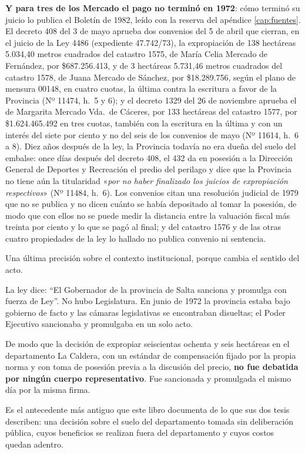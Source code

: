 \textbf{Y para tres de los Mercado el pago no terminó en 1972}: cómo terminó su juicio lo publica el Boletín de 1982, leído con la reserva del apéndice \ref{cap:fuentes}. El decreto 408 del 3 de mayo aprueba dos convenios del 5 de abril que cierran, en el juicio de la Ley 4486 (expediente 47.742/73), la expropiación de 138 hectáreas 5.034,40 metros cuadrados del catastro 1575, de María Celia Mercado de Fernández, por \$687.256.413, y de 3 hectáreas 5.731,46 metros cuadrados del catastro 1578, de Juana Mercado de Sánchez, por \$18.289.756, según el plano de mensura 00148, en cuatro cuotas, la última contra la escritura a favor de la Provincia (Nº 11474, h.\ 5 y 6); y el decreto 1329 del 26 de noviembre aprueba el de Margarita Mercado Vda.\ de Cáceres, por 133 hectáreas del catastro 1577, por \$1.624.465.492 en tres cuotas, también con la escritura en la última y con un interés del siete por ciento y no del seis de los convenios de mayo (Nº 11614, h.\ 6 a 8). Diez años después de la ley, la Provincia todavía no era dueña del suelo del embalse: once días después del decreto 408, el 432 da en posesión a la Dirección General de Deportes y Recreación el predio del perilago y dice que la Provincia no tiene aún la titularidad «\textit{por no haber finalizado los juicios de expropiación respectivos}» (Nº 11484, h.\ 6). Los convenios citan una resolución judicial de 1979 que no se publica y no dicen cuánto se había depositado al tomar la posesión, de modo que con ellos no se puede medir la distancia entre la valuación fiscal más treinta por ciento y lo que se pagó al final; y del catastro 1576 y de las otras cuatro propiedades de la ley lo hallado no publica convenio ni sentencia.

Una última precisión sobre el contexto institucional, porque cambia el sentido del acto.

La ley dice: ``El Gobernador de la provincia de Salta sanciona y promulga con fuerza de Ley''. No hubo Legislatura. En junio de 1972 la provincia estaba bajo gobierno de facto y las cámaras legislativas se encontraban disueltas; el Poder Ejecutivo sancionaba y promulgaba en un solo acto.

De modo que la decisión de expropiar seiscientas ochenta y seis hectáreas en el departamento La Caldera, con un estándar de compensación fijado por la propia norma y con toma de posesión previa a la discusión del precio, \textbf{no fue debatida por ningún cuerpo representativo}. Fue sancionada y promulgada el mismo día por la misma firma.

Es el antecedente más antiguo que este libro documenta de lo que sus dos tesis describen: una decisión sobre el suelo del departamento tomada sin deliberación pública, cuyos beneficios se realizan fuera del departamento y cuyos costos quedan adentro.

